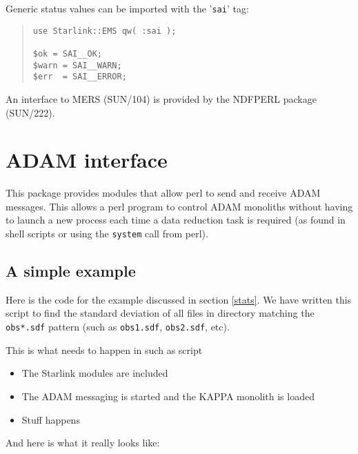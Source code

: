 \documentclass[twoside,11pt]{article}
\newenvironment{myquote}{\begin{quote}\begin{small}}{\end{small}\end{quote}}
\newcommand{\xref}[3]{#1}
\renewcommand{\_}{\texttt{\symbol{95}}}
\begin{document}
Generic status values can be imported with the '\texttt{sai}' tag:

\begin{myquote}
\begin{verbatim}
use Starlink::EMS qw( :sai );

$ok = SAI__OK;
$warn = SAI__WARN;
$err  = SAI__ERROR;
\end{verbatim}
\end{myquote}

An interface to MERS (\xref{SUN/104}{sun104}{}) is provided by the 
\xref{NDFPERL}{sun222}{} package (\xref{SUN/222}{sun222}{}).

\section{ADAM interface}

This package provides modules that allow perl to send and receive ADAM
messages. This allows a perl program to control ADAM monoliths without having
to launch a new process each time a data reduction task is required (as found
in \xref{shell scripts}{sc4}{} or using the \texttt{system} call from perl).


\subsection{A simple example}

Here is the code for the example discussed in section \ref{stats}. We have
written this script to find the standard deviation of all files in directory
matching the \texttt{obs*.sdf} pattern (such as \texttt{obs1.sdf},
\texttt{obs2.sdf}, etc).

This is what needs to happen in such as script

\begin{itemize} 

\item The Starlink modules are included

\item The ADAM messaging is started and the KAPPA monolith is loaded

\item Stuff happens

\end{itemize}

And here is what it really looks like:
\end{document}
